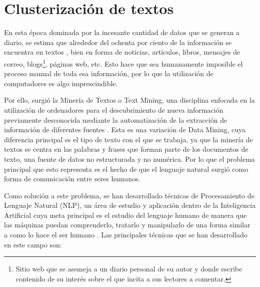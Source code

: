 \documentclass[10pt, a4paper]{article}
\begin{document}
\section{Clusterización de textos} \label{sec:clusterizacion de documentos}

En esta época dominada por la incesante cantidad de datos que se generan a diario, se estima que alrededor del ochenta por ciento de la información se encuentra en textos \cite{improved som algorithm applied in text clustering}, bien en forma de noticias, artículos, libros, mensajes de correo, blogs\footnote{Sitio web que se asemeja a un diario personal de su autor y donde escribe contenido de su interés sobre el que incita a sus lectores a comentar.}, páginas web, etc. Esto hace que sea humanamente imposible el proceso manual de toda esa información, por lo que la utilización de computadores es algo imprescindible.

Por ello, surgió la Minería de Textos o Text Mining, una disciplina enfocada en la utilización de ordenadores para el descubrimiento de nueva información previamente desconocida mediante la automatización de la extracción de información de diferentes fuentes \cite{a survey of text mining techniques and applications}. Esta es una variación de Data Mining, cuya diferencia principal es el tipo de texto con el que se trabaja, ya que la minería de textos se centra en las palabras y frases que forman parte de los documentos de texto, una fuente de datos no estructurada y no numérica. Por lo que el problema principal que esto representa es el hecho de que el lenguaje natural surgió como forma de comunicación entre seres humanos. 

Como solución a este problema, se han desarrollado técnicas de Procesamiento de Lenguaje Natural (NLP), un área de estudio y aplicación dentro de la Inteligencia Artificial cuya meta principal es el estudio del lenguaje humano de manera que las máquinas puedan comprenderlo, tratarlo y manipularlo  de una forma similar a como lo hace el ser humano \cite{TFG Jorge}. Las principales técnicas que se han desarrollado en este campo son:
\end{document}
